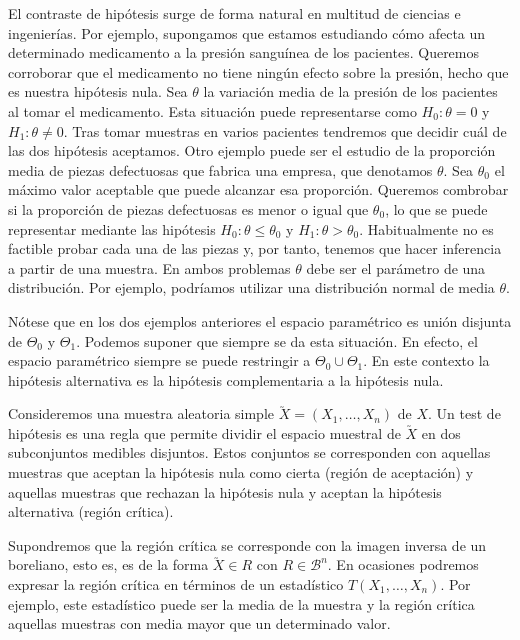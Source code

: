     El contraste de hipótesis surge de forma natural en multitud de ciencias e ingenierías. Por ejemplo, supongamos que estamos estudiando cómo afecta un determinado medicamento a la presión sanguínea de los pacientes. Queremos corroborar que el medicamento no tiene ningún efecto sobre la presión, hecho que es nuestra hipótesis nula. Sea $\theta$ la variación media de la presión de los pacientes al tomar el medicamento. Esta situación puede representarse como $H_0: \theta = 0$ y $H_1: \theta \ne 0$. Tras tomar muestras en varios pacientes tendremos que decidir cuál de las dos hipótesis aceptamos. Otro ejemplo puede ser el estudio de la proporción media de piezas defectuosas que fabrica una empresa, que denotamos $\theta$. Sea $\theta_0$ el máximo valor aceptable que puede alcanzar esa proporción. Queremos combrobar si la proporción de piezas defectuosas es menor o igual que $\theta_0$, lo que se puede representar mediante las hipótesis $H_0: \theta \le \theta_0$ y $H_1: \theta > \theta_0$. Habitualmente no es factible probar cada una de las piezas y, por tanto, tenemos que hacer inferencia a partir de una muestra. En ambos problemas $\theta$ debe ser el parámetro de una distribución. Por ejemplo, podríamos utilizar una distribución normal de media $\theta$.

    Nótese que en los dos ejemplos anteriores el espacio paramétrico es unión disjunta de $\Theta_0$ y $\Theta_1$. Podemos suponer que siempre se da esta situación. En efecto, el espacio paramétrico siempre se puede restringir a $\Theta_0 \cup \Theta_1$. En este contexto la hipótesis alternativa es la hipótesis complementaria a la hipótesis nula.

    \begin{definition}
        Consideremos una muestra aleatoria simple $\utilde{X} = (X_1, \dots, X_n)$ de $X$. Un test de hipótesis es una regla que permite dividir el espacio muestral de $\utilde{X}$ en dos subconjuntos medibles disjuntos. Estos conjuntos se corresponden con aquellas muestras que aceptan la hipótesis nula como cierta (región de aceptación) y aquellas muestras que rechazan la hipótesis nula y aceptan la hipótesis alternativa (región crítica).
    \end{definition}

    Supondremos que la región crítica se corresponde con la imagen inversa de un boreliano, esto es, es de la forma $\utilde{X} \in R$ con $R \in \mathcal{B}^n$. En ocasiones podremos expresar la región crítica en términos de un estadístico $T(X_1, \ldots, X_n)$. Por ejemplo, este estadístico puede ser la media de la muestra y la región crítica aquellas muestras con media mayor que un determinado valor.

